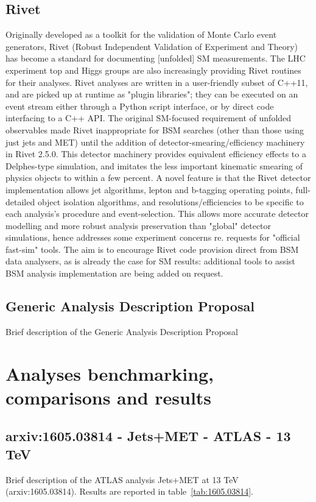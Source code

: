 \documentclass[11pt]{cernrep}
\begin{document}
\subsection{Rivet}
Originally developed as a toolkit for the validation of Monte Carlo event generators, Rivet (Robust Independent Validation of Experiment and Theory) has become a standard for documenting [unfolded] SM measurements. The LHC experiment top and Higgs groups are also increasingly providing Rivet routines for their analyses. Rivet analyses are written in a user-friendly subset of C++11, and are picked up at runtime as "plugin libraries"; they can be executed on an event stream either through a Python script interface, or by direct code interfacing to a C++ API.
The original SM-focused requirement of unfolded observables made Rivet inappropriate for BSM searches (other than those using just jets and MET) until the addition of detector-smearing/efficiency machinery in Rivet 2.5.0. This detector machinery provides equivalent efficiency effects to a Delphes-type simulation, and imitates the less important kinematic smearing of physics objects to within a few percent. A novel feature is that the Rivet detector implementation allows jet algorithms, lepton and b-tagging operating points, full-detailed object isolation algorithms, and resolutions/efficiencies to be specific to each analysis's procedure and event-selection. This allows more accurate detector modelling and more robust analysis preservation than "global" detector simulations, hence addresses some experiment concerns re. requests for "official fast-sim" tools. The aim is to encourage Rivet code provision direct from BSM data analysers, as is already the case for SM results: additional tools to assist BSM analysis implementation are being added on request.

\subsection{Generic Analysis Description Proposal}
Brief description of the Generic Analysis Description Proposal

\section{Analyses benchmarking, comparisons and results}

\subsection{arxiv:1605.03814 - Jets+MET - ATLAS - 13 TeV}
Brief description of the ATLAS analysis Jets+MET at 13 TeV (arxiv:1605.03814).
Results are reported in table~\ref{tab:1605.03814}.
\end{document}
